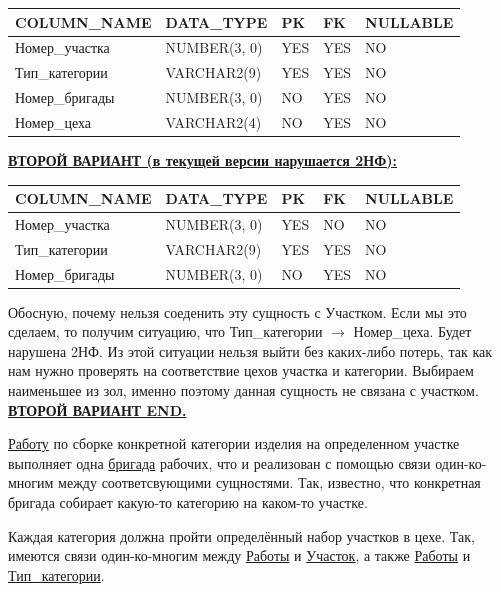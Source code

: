\begin{enumerate}
\begin{tabular}{|p{7cm}|p{3cm}|p{1cm}|p{1cm}|p{3cm}|}
        {\bf COLUMN\_NAME} & {\bf DATA\_TYPE} & {\bf PK} & {\bf FK} & {\bf NULLABLE} \\ \hline
        Номер\_участка & NUMBER(3, 0) & YES & YES & NO \\ \hline
        Тип\_категории & VARCHAR2(9) & YES & YES & NO \\ \hline
        Номер\_бригады & NUMBER(3, 0) & NO & YES & NO \\ \hline
        Номер\_цеха & VARCHAR2(4) & NO & YES & NO \\ \hline

    \end{tabular}

    {\bf \underline{ВТОРОЙ ВАРИАНТ (в текущей версии нарушается 2НФ): }}

    \begin{tabular}{|p{7cm}|p{3cm}|p{1cm}|p{1cm}|p{3cm}|} \hline

        {\bf COLUMN\_NAME} & {\bf DATA\_TYPE} & {\bf PK} & {\bf FK} & {\bf NULLABLE} \\ \hline
        Номер\_участка & NUMBER(3, 0) & YES & NO & NO \\ \hline
        Тип\_категории & VARCHAR2(9) & YES & YES & NO \\ \hline
        Номер\_бригады & NUMBER(3, 0) & NO & YES & NO \\ \hline

    \end{tabular}

        Обосную, почему нельзя соеденить эту сущность с Участком.
        Если мы это сделаем, то получим ситуацию, что Тип\_категории $\rightarrow$ Номер\_цеха.
        Будет нарушена 2НФ.
        Из этой ситуации нельзя выйти без каких-либо потерь, так как нам нужно проверять на соответствие цехов участка и категории.
        Выбираем наименьшее из зол, именно поэтому данная сущность не связана с участком.
    {\bf \underline{ВТОРОЙ ВАРИАНТ END.}}


    \underline{Работу} по сборке конкретной категории изделия на определенном участке выполняет одна \underline{бригада} рабочих, что и реализован с помощью связи один-ко-многим между соответсвующими сущностями.
    Так, известно, что конкретная бригада собирает какую-то категорию на каком-то участке.

    Каждая категория должна пройти определённый набор участков в цехе.
    Так, имеются связи один-ко-многим между \underline{Работы} и \underline{Участок}, а также \underline{Работы} и \underline{Тип\_категории}.


\end{enumerate}
